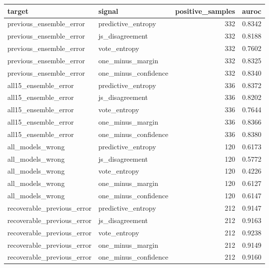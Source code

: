 \begin{tabular}{llrr}
\toprule
target & signal & positive\_samples & auroc \\
\midrule
previous\_ensemble\_error & predictive\_entropy & 332 & 0.8342 \\
previous\_ensemble\_error & js\_disagreement & 332 & 0.8188 \\
previous\_ensemble\_error & vote\_entropy & 332 & 0.7602 \\
previous\_ensemble\_error & one\_minus\_margin & 332 & 0.8325 \\
previous\_ensemble\_error & one\_minus\_confidence & 332 & 0.8340 \\
all15\_ensemble\_error & predictive\_entropy & 336 & 0.8372 \\
all15\_ensemble\_error & js\_disagreement & 336 & 0.8202 \\
all15\_ensemble\_error & vote\_entropy & 336 & 0.7644 \\
all15\_ensemble\_error & one\_minus\_margin & 336 & 0.8366 \\
all15\_ensemble\_error & one\_minus\_confidence & 336 & 0.8380 \\
all\_models\_wrong & predictive\_entropy & 120 & 0.6173 \\
all\_models\_wrong & js\_disagreement & 120 & 0.5772 \\
all\_models\_wrong & vote\_entropy & 120 & 0.4226 \\
all\_models\_wrong & one\_minus\_margin & 120 & 0.6127 \\
all\_models\_wrong & one\_minus\_confidence & 120 & 0.6147 \\
recoverable\_previous\_error & predictive\_entropy & 212 & 0.9147 \\
recoverable\_previous\_error & js\_disagreement & 212 & 0.9163 \\
recoverable\_previous\_error & vote\_entropy & 212 & 0.9238 \\
recoverable\_previous\_error & one\_minus\_margin & 212 & 0.9149 \\
recoverable\_previous\_error & one\_minus\_confidence & 212 & 0.9160 \\
\bottomrule
\end{tabular}
